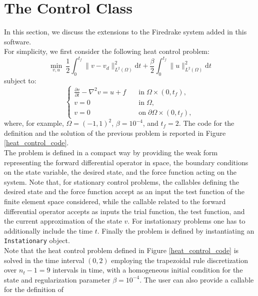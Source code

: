 \documentclass[letterpaper,10pt,english]{sphinxmanual}
\begin{document}
\section{The Control Class}
In this section, we discuss the extensions to the Firedrake system added in this
	software.\\
For simplicity, we first consider the following heat control problem:
	\begin{displaymath}
		\min_{v, u} ~ \frac{1}{2} \int_0^{t_f} \| v - v_d \|^2_{L^2(\Omega)}
		\mathrm{d} t + \frac{\beta}{2} \int_0^{t_f} \| u \|^2_{L^2(\Omega)}
		\mathrm{d} t
	\end{displaymath}
	subject to:
	\begin{displaymath}
		\left\{
			\begin{array}{ll}
				\frac{\partial v}{\partial t} -\nabla^2 v = u + f
					& \quad \mathrm{in} \; \Omega \times (0, t_f),\\
				v=0 & \quad \mathrm{in} \; \Omega,\\
				v=0 & \quad \mathrm{on} \; \partial \Omega
					\times(0, t_f),
			\end{array}
		\right.
	\end{displaymath}
	where, for example, $\Omega = (-1, 1)^2$, $\beta = 10^{-4}$,
	and $t_f = 2$. The code for the definition  and the solution of the previous problem
	is reported in Figure \ref{heat_control_code}.\\
The problem is defined in a compact way by providing the weak form representing
	the forward differential operator in space, the boundary conditions on
	the state variable, the desired state, and the force function acting on
	the system. Note that, for stationary control problems, the callables
	defining the desired state and the force function accept as an input
	the test function of the finite element space considered, while the
	callable related to the forward differential operator accepts as inputs
	the trial function, the test function, and the current approximation of
	the state $v$. For instationary problems one has to additionally include the
	time $t$. Finally the problem is defined by instantiating an
	\texttt{Instationary} object.\\
Note that the heat control problem defined in Figure \ref{heat_control_code}
	is solved in the time interval $(0,2)$ employing the trapezoidal rule
	discretization over $n_t-1=9$ intervals in time, with a homogeneous initial
	condition for the state and regularization parameter $\beta=10^{-4}$.
	The user can also provide a callable for the definition of
\end{document}
